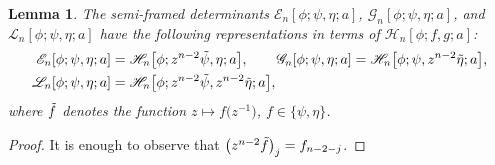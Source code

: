 \documentclass[pdftex]{sigma}
\numberwithin{equation}{section}
\newtheorem{Lemma}[Theorem]{Lemma}
 { \theoremstyle{definition}
\newtheorem{Definition}[Theorem]{Definition}
\newtheorem{Example}[Theorem]{Example}
\newtheorem{Remark}[Theorem]{Remark}
\newtheorem{Question}[Theorem]{Question}
}
\begin{document}
		\begin{Lemma}\label{EGL in terms of H}
			The semi-framed determinants $\mathscr{E}_n[\phi;\psi,\eta;a]$, $\mathscr{G}_n[\phi;\psi,\eta;a]$, and $\mathscr{L}_n[\phi;\psi,\eta;a]$ have the following representations in terms of $\mathscr{H}_n[\phi;f,g;a]$:
			\begin{align*}
				\mathscr{E}_n[\phi;\psi,\eta;a] & = \mathscr{H}_n\big[\phi;z^{n-2}\Tilde{\psi},\eta;a\big], \qquad
				\mathscr{G}_n[\phi;\psi,\eta;a] = \mathscr{H}_n\big[\phi;\psi,z^{n-2}\Tilde{\eta};a\big], \\
				\mathscr{L}_n[\phi;\psi,\eta;a] & = \mathscr{H}_n\big[\phi;z^{n-2}\Tilde{\psi},z^{n-2}\Tilde{\eta};a\big],
			\end{align*}
			where $\Tilde{f}$ denotes the function $z \mapsto f\big(z^{-1}\big)$, $f \in \{\psi,\eta\}$.
		\end{Lemma}
		\begin{proof}
			It is enough to observe that $\big( z^{n-2}\Tilde{f} \big)_j = f_{n-2-j}$.
		\end{proof}
		
\end{document}
